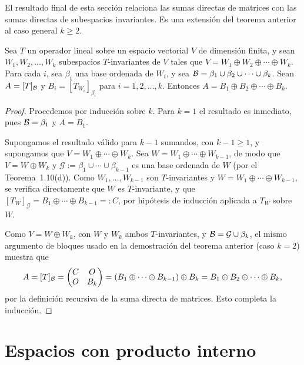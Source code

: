\documentclass[12pt,a4paper]{book}
\begin{document}
    El resultado final de esta sección relaciona las sumas directas de matrices con las sumas directas de subespacios invariantes. Es una extensión del teorema anterior al caso general $k\geq 2$.

    \begin{teorema}
        Sea $T$ un operador lineal sobre un espacio vectorial $V$ de dimensión finita, y sean $W_1,W_2,\dots,W_k$ subespacios $T$-invariantes de $V$ tales que $V=W_1\oplus W_2\oplus\cdots\oplus W_k$. Para cada $i$, sea $\beta_i$ una base ordenada de $W_i$, y sea $\mathcal{B}=\beta_1\cup\beta_2\cup\cdots\cup\beta_k$. Sean $A=[T]_{\mathcal{B}}$ y $B_i=[T_{W_i}]_{\beta_i}$ para $i=1,2,\dots,k$. Entonces $A=B_1\oplus B_2\oplus\cdots\oplus B_k$.
    \end{teorema}

    \begin{proof}
        Procedemos por inducción sobre $k$. Para $k=1$ el resultado es inmediato, pues $\mathcal{B}=\beta_1$ y $A=B_1$.

        Supongamos el resultado válido para $k-1$ sumandos, con $k-1\geq 1$, y supongamos que $V=W_1\oplus\cdots\oplus W_k$. Sea $W=W_1\oplus\cdots\oplus W_{k-1}$, de modo que $V=W\oplus W_k$ y $\mathcal{G}:=\beta_1\cup\cdots\cup\beta_{k-1}$ es una base ordenada de $W$ (por el Teorema~1.10(d)). Como $W_1,\dots,W_{k-1}$ son $T$-invariantes y $W=W_1\oplus\cdots\oplus W_{k-1}$, se verifica directamente que $W$ es $T$-invariante, y que $[T_W]_{\mathcal{G}}=B_1\oplus\cdots\oplus B_{k-1}=:C$, por hipótesis de inducción aplicada a $T_W$ sobre $W$.

        Como $V=W\oplus W_k$, con $W$ y $W_k$ ambos $T$-invariantes, y $\mathcal{B}=\mathcal{G}\cup\beta_k$, el mismo argumento de bloques usado en la demostración del teorema anterior (caso $k=2$) muestra que
        \begin{equation*}
            A=[T]_{\mathcal{B}}=\begin{pmatrix}C&O\\O&B_k\end{pmatrix}=(B_1\oplus\cdots\oplus B_{k-1})\oplus B_k=B_1\oplus B_2\oplus\cdots\oplus B_k,
        \end{equation*}
        por la definición recursiva de la suma directa de matrices. Esto completa la inducción.
    \end{proof}

    \chapter{Espacios con producto interno}
\end{document}

